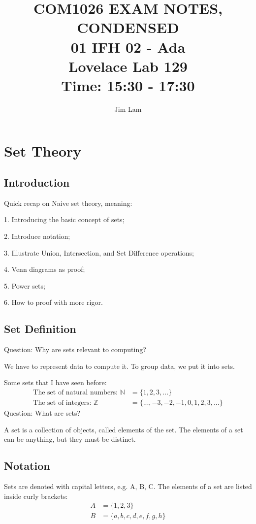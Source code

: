 \documentclass{article}
\author{Jim Lam}
\begin{document}
\title{%
    COM1026 EXAM NOTES, CONDENSED \\
    \large 01 IFH 02 - Ada \\
    Lovelace Lab 129 \\
    Time: 15:30 - 17:30 \\
    }
\maketitle
\tableofcontents
\section{Set Theory}

\subsection{Introduction}
Quick recap on Naive set theory, meaning:

1. Introducing the basic concept of sets;

2. Introduce notation;

3. Illustrate Union, Intersection, and Set Difference operations;

4. Venn diagrams as proof;

5. Power sets;

6. How to proof with more rigor.

\subsection{Set Definition}

Question: Why are sets relevant to computing?

We have to represent data to compute it.
To group data, we put it into sets.

Some sets that I have seen before:
\begin{align*}
    \text{The set of natural numbers: } \mathbb{N} & = \{1, 2, 3, ...\}                    \\
    \text{The set of integers: } \mathbb{Z}        & = \{..., -3, -2, -1, 0, 1, 2, 3,...\}
\end{align*}
Question: What are sets?


A set is a collection of objects, called elements of the set. The elements of a set can be anything, but they must be distinct.

\subsection{Notation}
Sets are denoted with capital letters, e.g. A, B, C. The elements of a set are listed inside curly brackets:
\begin{align*}
    A & = \{1, 2, 3\}                \\
    B & = \{a, b, c, d, e, f, g, h\}
\end{align*}
\end{document}
